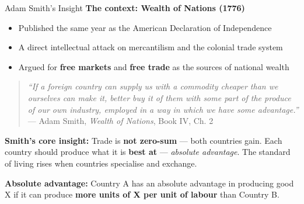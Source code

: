 \documentclass[
  ignorenonframetext,
  aspectratio=169,
]{beamer}
\makeatletter
\providecommand{\tightlist}{%
  \setlength{\itemsep}{0pt}\setlength{\parskip}{0pt}}
\let\quarto@originallabel\label
\DeclareRobustCommand*{\label}[1]{\quarto@originallabel{#1}}
\makeatother
\begin{document}
\begin{frame}{Adam Smith's Insight}
\label{adam-smiths-insight}
\textbf{The context: Wealth of Nations (1776)}

\begin{itemize}
\tightlist
\item
  Published the same year as the American Declaration of Independence
\item
  A direct intellectual attack on mercantilism and the colonial trade
  system
\item
  Argued for \textbf{free markets} and \textbf{free trade} as the
  sources of national wealth
\end{itemize}

\begin{quote}
\emph{``If a foreign country can supply us with a commodity cheaper than
we ourselves can make it, better buy it of them with some part of the
produce of our own industry, employed in a way in which we have some
advantage.''} --- Adam Smith, \emph{Wealth of Nations}, Book IV, Ch. 2
\end{quote}

\textbf{Smith's core insight:} Trade is \textbf{not zero-sum} --- both
countries gain. Each country should produce what it is \textbf{best at}
--- \emph{absolute advantage}. The standard of living rises when
countries specialise and exchange.

\textbf{Absolute advantage:} Country A has an absolute advantage in
producing good X if it can produce \textbf{more units of X per unit of
labour} than Country B.
\end{frame}
\end{document}
